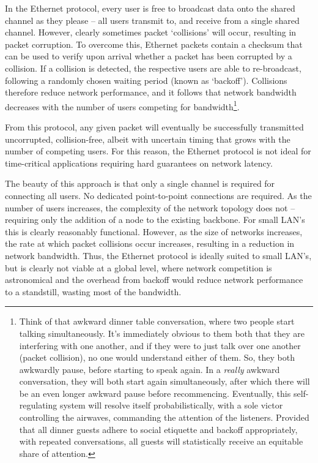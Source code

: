 \documentclass[aps,rmp,twocolumn,amsmath,amssymb,nofootinbib,superscriptaddress]{revtex4}
\begin{document}
In the Ethernet protocol, every user is free to broadcast data onto the shared channel as they please -- all users transmit to, and receive from a single shared channel. However, clearly sometimes packet `collisions' will occur, resulting in packet corruption. To overcome this, Ethernet packets contain a checksum that can be used to verify upon arrival whether a packet has been corrupted by a collision. If a collision is detected, the respective users are able to re-broadcast, following a randomly chosen waiting period (known as `backoff'). Collisions therefore reduce network performance, and it follows that network bandwidth decreases with the number of users competing for bandwidth\footnote{Think of that awkward dinner table conversation, where two people start talking simultaneously. It's immediately obvious to them both that they are interfering with one another, and if they were to just talk over one another (packet collision), no one would understand either of them. So, they both awkwardly pause, before starting to speak again. In a \emph{really} awkward conversation, they will both start again simultaneously, after which there will be an even longer awkward pause before recommencing. Eventually, this self-regulating system will resolve itself probabilistically, with a sole victor controlling the airwaves, commanding the attention of the listeners. Provided that all dinner guests adhere to social etiquette and backoff appropriately, with repeated conversations, all guests will statistically receive an equitable share of attention.}.

From this protocol, any given packet will eventually be successfully transmitted uncorrupted, collision-free, albeit with uncertain timing that grows with the number of competing users. For this reason, the Ethernet protocol is not ideal for time-critical applications requiring hard guarantees on network latency.

The beauty of this approach is that only a single channel is required for connecting all users. No dedicated point-to-point connections are required. As the number of users increases, the complexity of the network topology does not -- requiring only the addition of a node to the existing backbone. For small LAN's this is clearly reasonably functional. However, as the size of networks increases, the rate at which packet collisions occur increases, resulting in a reduction in network bandwidth. Thus, the Ethernet protocol is ideally suited to small LAN's, but is clearly not viable at a global level, where network competition is astronomical and the overhead from backoff would reduce network performance to a standstill, wasting most of the bandwidth.
\end{document}
